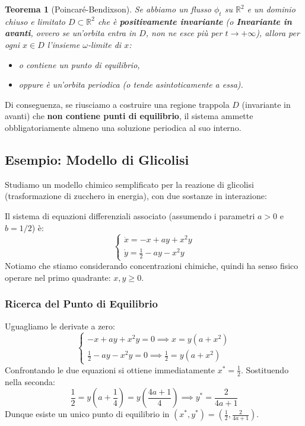 \documentclass[openany]{book}
\newtheorem*{teorema}{Teorema}
\theoremstyle{definition}
\theoremstyle{remark}
\newcommand{\R}{\mathbb{R}}
\begin{document}
\begin{teorema}[Poincaré-Bendixson]
Se abbiamo un flusso $\phi_t$ su $\R^2$ e un dominio chiuso e limitato $D \subset \R^2$ che è \textbf{positivamente invariante} (o \textbf{Invariante in avanti}, ovvero se un'orbita entra in $D$, non ne esce più per $t \to +\infty$), allora per ogni $x \in D$ l'insieme $\omega$-limite di $x$:
\begin{itemize}
    \item o contiene un punto di equilibrio,
    \item oppure è un'orbita periodica (o tende asintoticamente a essa).
\end{itemize}
\end{teorema}

Di conseguenza, se riusciamo a costruire una regione trappola $D$ (invariante in avanti) che \textbf{non contiene punti di equilibrio}, il sistema ammette obbligatoriamente almeno una soluzione periodica al suo interno.

\subsection*{Esempio: Modello di Glicolisi}

Studiamo un modello chimico semplificato per la reazione di glicolisi (trasformazione di zucchero in energia), con due sostanze in interazione:
\begin{center}
\end{center}

Il sistema di equazioni differenziali associato (assumendo i parametri $a > 0$ e $b = 1/2$) è:
\begin{equation}
\begin{cases}
\dot{x} = -x + ay + x^2y \\
\dot{y} = \frac{1}{2} - ay - x^2y
\end{cases}
\end{equation}
Notiamo che stiamo considerando concentrazioni chimiche, quindi ha senso fisico operare nel primo quadrante: $x, y \ge 0$.

\subsubsection*{Ricerca del Punto di Equilibrio}
Uguagliamo le derivate a zero:
\[
\begin{cases}
-x + ay + x^2y = 0 \implies x = y(a+x^2) \\
\frac{1}{2} - ay - x^2y = 0 \implies \frac{1}{2} = y(a+x^2)
\end{cases}
\]
Confrontando le due equazioni si ottiene immediatamente $x^* = \frac{1}{2}$. Sostituendo nella seconda:
\[
\frac{1}{2} = y\left(a + \frac{1}{4}\right) = y\left(\frac{4a+1}{4}\right) \implies y^* = \frac{2}{4a+1}
\]
Dunque esiste un unico punto di equilibrio in $(x^*, y^*) = \left( \frac{1}{2}, \frac{2}{4a+1} \right)$.
\end{document}
